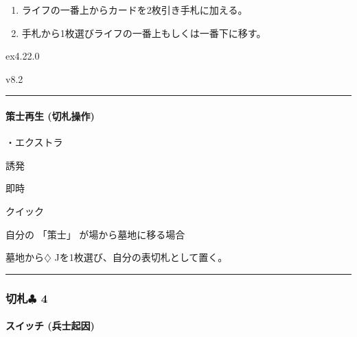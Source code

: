 \documentclass[letterpaper,10pt,dvipdfmx]{sphinxmanual}
\begin{document}
\sphinxAtStartPar
{}
\begin{enumerate}
%
\item {} 
\sphinxAtStartPar
ライフの一番上からカードを2枚引き手札に加える。

\item {} 
\sphinxAtStartPar
手札から1枚選びライフの一番上もしくは一番下に移す。

\end{enumerate}

\sphinxAtStartPar
{}  ex4.22.0

\sphinxAtStartPar
{}  v8.2


\bigskip\hrule\bigskip



\paragraph{策士再生 (切札操作)}
\label{\detokenize{auto/frameActionlist:act-strategistrevive}}\label{\detokenize{auto/frameActionlist:id68}}
\sphinxAtStartPar
{}

\sphinxAtStartPar
・エクストラ

\sphinxAtStartPar
{} 誘発

\sphinxAtStartPar
{} 即時

\sphinxAtStartPar
{} クイック

\sphinxAtStartPar
{}

\sphinxAtStartPar
自分の 「策士」 が場から墓地に移る場合

\sphinxAtStartPar
{}

\sphinxAtStartPar
墓地から{\normalsize $\diamondsuit$} Jを1枚選び、自分の表切札として置く。


\bigskip\hrule\bigskip



\subsubsection{切札{\normalsize $\clubsuit$} 4}
\label{\detokenize{auto/frameActionlist:id69}}

\paragraph{スイッチ (兵士起因)}
\label{\detokenize{auto/frameActionlist:act-switch}}\label{\detokenize{auto/frameActionlist:id70}}
\sphinxAtStartPar
{}
\end{document}
